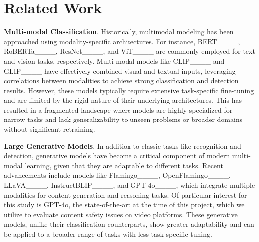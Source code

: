 \section{Related Work}
\label{sec: Related Work}


    
    \textbf{Multi-modal Classification}. Historically, multimodal modeling has been approached using modality-specific architectures. For instance, BERT____, RoBERTa____, ResNet____, and ViT____ are commonly employed for text and vision tasks, respectively. Multi-modal models like CLIP____ and GLIP____ have effectively combined visual and textual inputs, leveraging correlations between modalities to achieve strong classification and detection results. However, these models typically require extensive task-specific fine-tuning and are limited by the rigid nature of their underlying architectures. This has resulted in a fragmented landscape where models are highly specialized for narrow tasks and lack generalizability to unseen problems or broader domains without significant retraining.
    
    \textbf{Large Generative Models}. In addition to classic tasks like recognition and detection, generative models have become a critical component of modern multi-modal learning, given that they are adaptable to different tasks. Recent advancements include models like Flamingo____, OpenFlamingo____, LLaVA____, InstructBLIP____, and GPT-4o____, which integrate multiple modalities for content generation and reasoning tasks. Of particular interest for this study is GPT-4o, the state-of-the-art at the time of this project, which we utilize to evaluate content safety issues on video platforms. These generative models, unlike their classification counterparts, show greater adaptability and can be applied to a broader range of tasks with less task-specific tuning.